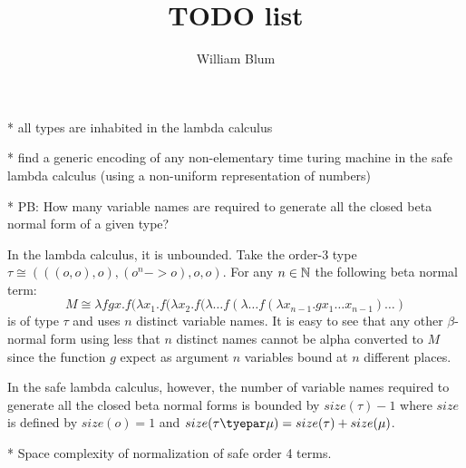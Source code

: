 \documentclass{article}
\title{TODO list}
\author{William Blum}
\begin{document}
\maketitle

* all types are inhabited in the lambda calculus

* find a generic encoding of any non-elementary time turing machine
in the safe lambda calculus (using a non-uniform representation of
numbers)

* PB: How many variable names are required to generate all the
closed beta normal form of a given type?

In the lambda calculus, it is unbounded. Take the order-3 type $\tau
\cong (((o,o),o), (o^n->o), o, o)$. For any $n\in\mathbb{N}$ the following
beta normal term:
$$ M \cong \lambda f g x . f (\lambda x_1.f(\lambda x_2.f(\lambda \ldots f(\lambda \ldots f(\lambda x_{n-1}.g x_1 \ldots x_{n-1}) \ldots )$$
is of type $\tau$ and uses $n$ distinct variable names. It is easy to see that
any other $\beta$-normal form using less that $n$ distinct names cannot be alpha converted to $M$
since the function $g$ expect as argument $n$ variables bound at $n$ different places.


In the safe lambda calculus, however, the number of variable names required to generate
all the closed beta normal forms is bounded by $size(\tau)-1$ where $size$ is defined by
$size(o)= 1$ and $size(\tau\tyepar\mu) = size(\tau) + size(\mu)$.

* Space complexity of normalization of safe order 4 terms.
\end{document}
